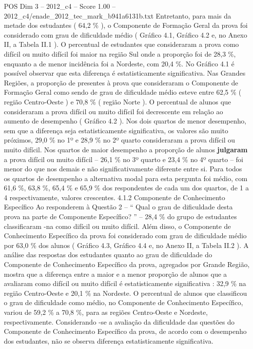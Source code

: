 \begin{textsample}{POS Dim 3 – 2012\_c4 – Score 1.00 – 2012\_c4/enade\_2012\_tec\_mark\_b941a6131b.txt}
Entretanto, para mais da metade dos estudantes ( 64,2 \% ), o Componente de Formação Geral da prova foi considerado com grau de dificuldade médio ( Gráfico 4.1, Gráfico 4.2 e, no Anexo II, a Tabela II.1 ).
O percentual de estudantes que consideraram a prova como difícil ou muito difícil foi maior na região Sul onde a proporção foi de 28,3 \%, enquanto a de menor incidência foi a Nordeste, com 20,4 \%.
No Gráfico 4.1 é possível observar que esta diferença é estatisticamente significativa.
Nas Grandes Regiões, a proporção de presentes à prova que consideraram o Componente de Formação Geral como sendo de grau de dificuldade médio esteve entre 62,5 \% ( região Centro-Oeste ) e 70,8 \% ( região Norte ).
O percentual de alunos que consideraram a prova difícil ou muito difícil foi decrescente em relação ao aumento de desempenho ( Gráfico 4.2 ).
Nos dois quartos de menor desempenho, sem que a diferença seja estatisticamente significativa, os valores são muito próximos, 29,0 \% no 1º e 28,9 \% no 2º quarto consideraram a prova difícil ou muito difícil.
Nos quartos de maior desempenho a proporção de alunos \textbf{julgaram} a prova difícil ou muito difícil – 26,1 \% no 3º quarto e 23,4 \% no 4º quarto – foi menor do que nos demais e não significativamente diferente entre si.
Para todos os quartos de desempenho a alternativa modal para esta pergunta foi médio, com 61,6 \%, 63,8 \%, 65,4 \% e 65,9 \% dos respondentes de cada um dos quartos, de 1 a 4 respectivamente, valores crescentes. 4.1.2 Componente de Conhecimento Específico Ao responderem à Questão 2 – “ Qual o grau de dificuldade desta prova na parte de Componente Específico? ” – 28,4 \% do grupo de estudantes classificaram -na como difícil ou muito difícil.
Além disso, o Componente de Conhecimento Específico da prova foi considerado com grau de dificuldade médio por 63,0 \% dos alunos ( Gráfico 4.3, Gráfico 4.4 e, no Anexo II, a Tabela II.2 ).
A análise das respostas dos estudantes quanto ao grau de dificuldade do Componente de Conhecimento Específico da prova, agregados por Grande Região, mostra que a diferença entre a maior e a menor proporção de alunos que a avaliaram como difícil ou muito difícil é estatisticamente significativa : 32,9 \% na região Centro-Oeste e 20,1 \% na Nordeste.
O percentual de alunos que classificou o grau de dificuldade como médio, no Componente de Conhecimento Específico, variou de 59,2 \% a 70,8 \%, para as regiões Centro-Oeste e Nordeste, respectivamente.
Considerando -se a avaliação da dificuldade das questões do Componente de Conhecimento Específico da prova, de acordo com o desempenho dos estudantes, não se observa diferença estatisticamente significativa.

\end{textsample}
